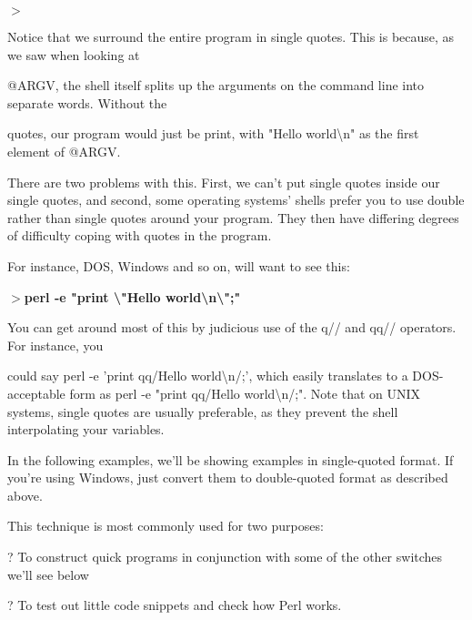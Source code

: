 \documentclass[a4paper,11pt]{book}
\begin{document}
\noindent $>$

\noindent 

\noindent Notice that we surround the entire program in single quotes. This is because, as we saw when looking at

\noindent @ARGV, the shell itself splits up the arguments on the command line into separate words. Without the

\noindent quotes, our program would just be print, with "Hello world\textbackslash n" as the first element of @ARGV.

\noindent 

\noindent There are two problems with this. First, we can't put single quotes inside our single quotes, and second, some operating systems' shells prefer you to use double rather than single quotes around your program. They then have differing degrees of difficulty coping with quotes in the program.

\noindent 

\noindent For instance, DOS, Windows and so on, will want to see this:

\noindent 

\noindent $>$\textbf{perl -e "print \textbackslash "Hello world\textbackslash n\textbackslash ";"}

\noindent 

\noindent You can get around most of this by judicious use of the q// and qq// operators. For instance, you

\noindent could say perl -e 'print qq/Hello world\textbackslash n/;', which easily translates to a DOS-acceptable form as perl -e "print qq/Hello world\textbackslash n/;". Note that on UNIX systems, single quotes are usually preferable, as they prevent the shell interpolating your variables.

\noindent 

\noindent In the following examples, we'll be showing examples in single-quoted format. If you're using Windows, just convert them to double-quoted format as described above.

\noindent 

\noindent 

\noindent This technique is most commonly used for two purposes:

\noindent 

\noindent ? To construct quick programs in conjunction with some of the other switches we'll see below

\noindent 

\noindent ? To test out little code snippets and check how Perl works.
\end{document}
